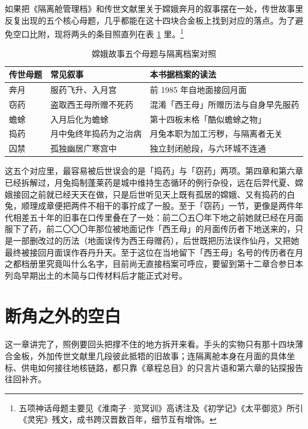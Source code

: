 如果把《隔离舱管理档》和传世文献里关于嫦娥奔月的叙事摆在一处，传世故事里反复出现的五个核心母题，几乎都能在这十四块合金板上找到对应的落点。为了避免空口比附，现将两头的条目照直列在表 \ref{tab:chang-e-motifs} 里。\footnote{五项神话母题主要见《淮南子·览冥训》高诱注及《初学记》《太平御览》所引《灵宪》残文，成书跨汉晋数百年，细节互有增饰。}

\begin{table}[htbp]
  \centering
  \caption{嫦娥故事五个母题与隔离档案对照}
  \label{tab:chang-e-motifs}
  \begin{tabular}{@{}p{18mm}p{40mm}p{66mm}@{}}
    \toprule
    传世母题 & 常见叙事 & 本书据档案的读法 \\
    \midrule
    奔月 & 服药飞升、入月宫 & 前 1985 年自地面接回月面 \\
    窃药 & 盗取西王母所赠不死药 & 混淆「西王母」所赠历法与自身早先服药 \\
    蟾蜍 & 入月后化为蟾蜍 & 第十四板末格「酷似蟾蜍之物」 \\
    捣药 & 月中兔终年捣药为之治病 & 月兔本职为加工污秽，与隔离者无关 \\
    囚禁 & 孤独幽居广寒宫中 & 独立封闭舱段，与六环城不连通 \\
    \bottomrule
  \end{tabular}
\end{table}

这五个对应里，最容易被后世误会的是「捣药」与「窃药」两项。第四章和第六章已经拆解过，月兔捣制蓬莱药是城中维持生态循环的例行杂役，远在后羿代夏、嫦娥接回之前就已经天天在做，只是后世听见天上既有孤居的嫦娥、又有捣药的白兔，顺理成章便把两件不相干的事拧成了一股。至于「窃药」一节，更像是两件年代相差五十年的旧事在口传里叠在了一处：前二〇五〇年下地之前她就已经在月面服下了药，前二〇〇〇年那位被地面记作「西王母」的月面传历者下地送来的，只是一部删改过的历法（地面误传为西王母赠药），后世既把历法误作仙丹，又把她最终被接回月面误作吞丹升天。至于这位在当地留下「西王母」名号的传历者在月之都档册里究竟叫什么名字，目前尚无直接档案可呼应，要留到第十二章合参日本列岛早期出土的木简与口传材料后才能正式对号。

\section{断角之外的空白}

这一章讲完了，照例要回头把撑不住的地方拆开来看。手头的实物只有那十四块薄合金板，外加传世文献里几段彼此抵牾的旧故事；连隔离舱本身在月面的具体坐标、供电如何接往地核链路，都只靠《章程总目》的只言片语和第六章的钻探报告往回补齐。

